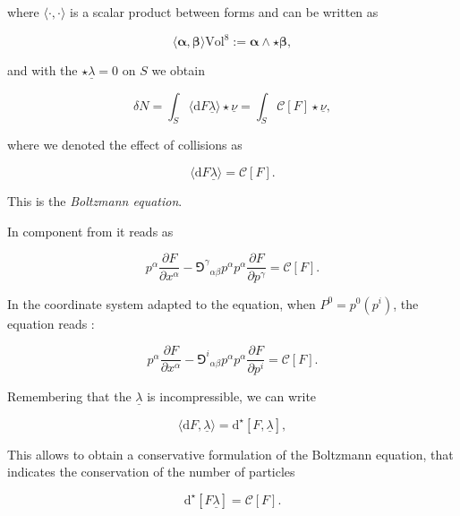 where $\langle\cdot,\cdot\rangle$ is a scalar product between forms and can be written as

\begin{equation}
    \langle\boldsymbol{\alpha},\boldsymbol{\beta}\rangle\text{Vol}^8 := \boldsymbol{\alpha}\wedge\star\boldsymbol{\beta},
\end{equation}

and with the $\star\underline{\lambda}=0$ on $S$ we obtain 

\begin{equation}
    \delta N = \int_S\langle\text{d}F\underline{\lambda}\rangle\star\underline{\nu} = \int_S\mathcal{C}[F]\star\underline{\nu},
\end{equation}

where we denoted the effect of collisions as

\begin{equation}
    \langle\text{d}F\underline{\lambda}\rangle = \mathcal{C}[F].
\end{equation}

This is the \textit{Boltzmann equation}. 

In component from it reads as 

\begin{equation}
    p^{\alpha}\frac{\partial F}{\partial x^{\alpha}} - {\Game^{\gamma}}_{\alpha\beta}p^{\alpha}p^{\alpha}\frac{\partial F}{\partial p^{\gamma}} =\mathcal{C}[F].
\end{equation}

In the coordinate system adapted to the equation, when $P^0 = p^0(p^i)$, the equation reads \cite{Cercignani:2002}:

\begin{equation}
    p^{\alpha}\frac{\partial F}{\partial x^{\alpha}} - {\Game^{i}}_{\alpha\beta}p^{\alpha}p^{\alpha}\frac{\partial F}{\partial p^{i}} =\mathcal{C}[F].
\end{equation}

Remembering that the $\underline{\lambda}$ is incompressible, we can write

\begin{equation}
    \langle\text{d}F,\underline{\lambda}\rangle = \text{d}^{\star}[F,\underline{\lambda}],
\end{equation}

This allows to obtain a conservative formulation of the Boltzmann equation, that indicates the conservation of the number of particles \cite{Cardall:2002bp}

\begin{equation}
    \text{d}^{\star}[F\underline{\lambda}] = \mathcal{C}[F].
\end{equation}

